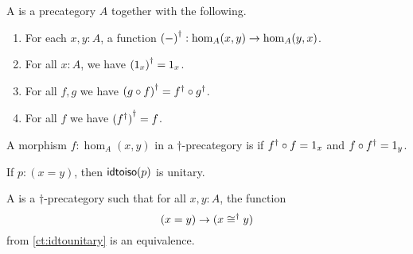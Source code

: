 \documentclass[hott-all.tex]{subfiles}
\begin{document}

\begin{defn}\label{ct:dagger-precategory}
  A 
  is a precategory $A$ together with the following.
  \begin{enumerate}
  \item For each $x,y:A$, a function ${(-)}^{\dagger}:\hom_A(x,y) \to \hom_A(y,x)$.
  \item For all $x:A$, we have ${(1_x)}^{\dagger} = 1_x$.
  \item For all $f,g$ we have ${(g\circ f)}^{\dagger} = {f}^{\dagger} \circ {g}^{\dagger}$.
  \item For all $f$ we have ${({f}^{\dagger})}^{\dagger} = f$.
  \end{enumerate}
\end{defn}

\begin{defn}\label{ct:unitary}
  A morphism $f:\hom_A(x,y)$ in a $\dagger$-precategory is 
  if ${f}^{\dagger} \circ f = 1_x$ and $f\circ {f}^{\dagger} = 1_y$.
\end{defn}


\begin{lem}\label{ct:idtounitary}
  If $p:(x=y)$, then $\mathsf{idtoiso}(p)$ is unitary.
\end{lem}

\begin{defn}\label{ct:dagger-category}
  A 
  is a $\dagger$-precategory such that for all $x,y:A$, the function
  \[ (x=y) \to (x \mathrel{\cong^\dagger} y) \]
  from \cref{ct:idtounitary} is an equivalence.
\end{defn}
\end{document}
